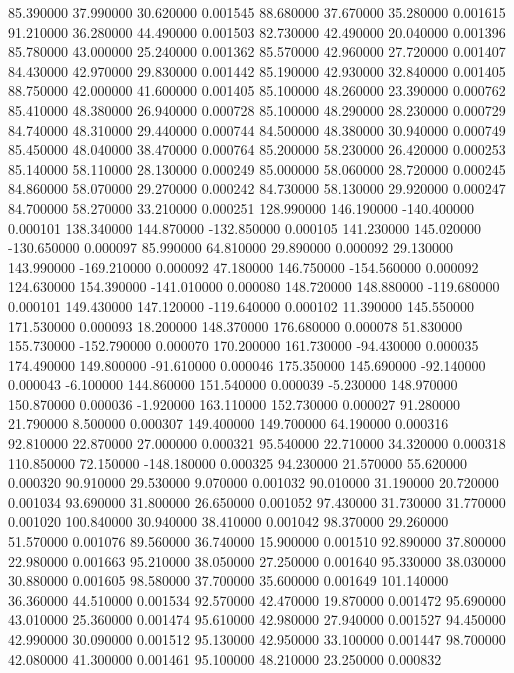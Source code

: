 85.390000 37.990000 30.620000 0.001545 
88.680000 37.670000 35.280000 0.001615 
91.210000 36.280000 44.490000 0.001503 
82.730000 42.490000 20.040000 0.001396 
85.780000 43.000000 25.240000 0.001362 
85.570000 42.960000 27.720000 0.001407 
84.430000 42.970000 29.830000 0.001442 
85.190000 42.930000 32.840000 0.001405 
88.750000 42.000000 41.600000 0.001405 
85.100000 48.260000 23.390000 0.000762 
85.410000 48.380000 26.940000 0.000728 
85.100000 48.290000 28.230000 0.000729 
84.740000 48.310000 29.440000 0.000744 
84.500000 48.380000 30.940000 0.000749 
85.450000 48.040000 38.470000 0.000764 
85.200000 58.230000 26.420000 0.000253 
85.140000 58.110000 28.130000 0.000249 
85.000000 58.060000 28.720000 0.000245 
84.860000 58.070000 29.270000 0.000242 
84.730000 58.130000 29.920000 0.000247 
84.700000 58.270000 33.210000 0.000251 
128.990000 146.190000 -140.400000 0.000101 
138.340000 144.870000 -132.850000 0.000105 
141.230000 145.020000 -130.650000 0.000097 
85.990000 64.810000 29.890000 0.000092 
29.130000 143.990000 -169.210000 0.000092 
47.180000 146.750000 -154.560000 0.000092 
124.630000 154.390000 -141.010000 0.000080 
148.720000 148.880000 -119.680000 0.000101 
149.430000 147.120000 -119.640000 0.000102 
11.390000 145.550000 171.530000 0.000093 
18.200000 148.370000 176.680000 0.000078 
51.830000 155.730000 -152.790000 0.000070 
170.200000 161.730000 -94.430000 0.000035 
174.490000 149.800000 -91.610000 0.000046 
175.350000 145.690000 -92.140000 0.000043 
-6.100000 144.860000 151.540000 0.000039 
-5.230000 148.970000 150.870000 0.000036 
-1.920000 163.110000 152.730000 0.000027 
91.280000 21.790000 8.500000 0.000307 
149.400000 149.700000 64.190000 0.000316 
92.810000 22.870000 27.000000 0.000321 
95.540000 22.710000 34.320000 0.000318 
110.850000 72.150000 -148.180000 0.000325 
94.230000 21.570000 55.620000 0.000320 
90.910000 29.530000 9.070000 0.001032 
90.010000 31.190000 20.720000 0.001034 
93.690000 31.800000 26.650000 0.001052 
97.430000 31.730000 31.770000 0.001020 
100.840000 30.940000 38.410000 0.001042 
98.370000 29.260000 51.570000 0.001076 
89.560000 36.740000 15.900000 0.001510 
92.890000 37.800000 22.980000 0.001663 
95.210000 38.050000 27.250000 0.001640 
95.330000 38.030000 30.880000 0.001605 
98.580000 37.700000 35.600000 0.001649 
101.140000 36.360000 44.510000 0.001534 
92.570000 42.470000 19.870000 0.001472 
95.690000 43.010000 25.360000 0.001474 
95.610000 42.980000 27.940000 0.001527 
94.450000 42.990000 30.090000 0.001512 
95.130000 42.950000 33.100000 0.001447 
98.700000 42.080000 41.300000 0.001461 
95.100000 48.210000 23.250000 0.000832 

